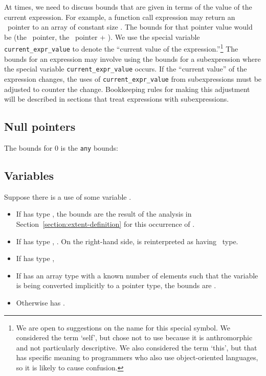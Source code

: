 At times, we need to discuss bounds that are given in terms of the value
of the current expression. For example, a function call expression may
return an \arrayptr\ pointer to an array of constant size
. The bounds for that pointer value would be (the
\arrayptr\ pointer, the \arrayptr\ pointer +
). We use the special variable \texttt{current\_expr\_value} to
denote the ``current value of the expression.''\footnote{We are open to
  suggestions on the name for this special symbol. We considered the
  term `self', but chose not to use because it is anthromorphic and not
  particularly descriptive. We also considered the term `this', but that
  has specific meaning to programmers who also use object-oriented
  languages, so it is likely to cause confusion.} The bounds for an
expression may involve using the bounds for a subexpression where the
special variable \texttt{current\_expr\_value} occurs. If the ``current
value'' of the expression changes, the uses of
\texttt{current\_expr\_value} from subexpressions must be adjusted to
counter the change. Bookkeeping rules for making this adjustment will be
described in sections that treat expressions with subexpressions.

\subsection{Null pointers}

The bounds for 0 is the \texttt{any} bounds:


\subsection{Variables}
\label{section:checking-variables}

Suppose there is a use of some variable .

\begin{itemize}
\item
  If  has type \arrayptr, the bounds are the result of
  the analysis in Section~\ref{section:extent-definition}
  for this occurrence of .
\item
  If  has type \ptrT, 
  .
   On the right-hand side,  is reinterpreted as having \arrayptr\ type.
\item
  If  has type
  \arrayviewT, 
\item
  If  has an array type with a known number of elements 
  such that the variable is being converted implicitly to a pointer
  type, the bounds are  .
\item
  Otherwise  has \boundsnone.
\end{itemize}


